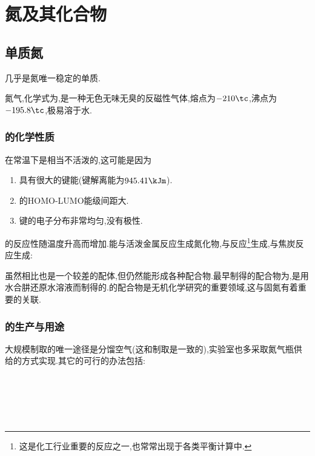 \documentclass{ctexart}
\begin{document}
\section{氮及其化合物}
\subsection{单质氮}
几乎是氮唯一稳定的单质.
\begin{substance}[\ce{N2}]
    氮气,化学式为,是一种无色无味无臭的反磁性气体,熔点为$-210\tc$,沸点为$-195.8\tc$,极易溶于水.
\end{substance}
\subsubsection{的化学性质}
在常温下是相当不活泼的,这可能是因为
\begin{enumerate}[label=\tbf{\arabic*.},topsep=0pt,parsep=0pt,itemsep=0pt,partopsep=0pt]
    \item {}具有很大的键能(键解离能为$945.41\kJm$).
    \item {}的HOMO-LUMO能级间距大.
    \item {}键的电子分布非常均匀,没有极性.
\end{enumerate}
的反应性随温度升高而增加.能与活泼金属反应生成氮化物,与反应\footnote{这是化工行业重要的反应之一,也常常出现于各类平衡计算中.}生成,与焦炭反应生成:
\begin{center}
\end{center}
虽然相比也是一个较差的配体,但仍然能形成各种配合物.最早制得的配合物为,是用水合肼还原水溶液而制得的.的配合物是无机化学研究的重要领域,这与固氮有着重要的关联.
\subsubsection{的生产与用途}
大规模制取的唯一途径是分馏空气(这和制取是一致的),实验室也多采取氮气瓶供给的方式实现.其它的可行的办法包括:
\begin{center}
    \\
    \\
    \\
    \\
\end{center}
\end{document}
